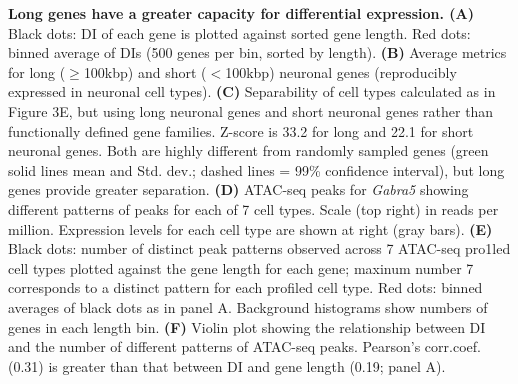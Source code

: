 \textbf{Long genes have a greater capacity for differential expression. (A)} Black dots: DI of each gene is plotted against sorted gene length. Red dots: binned average of DIs (500 genes per bin, sorted by length). \textbf{(B)} Average metrics for long ($\geq$100kbp) and short ($<$100kbp) neuronal genes (reproducibly expressed in neuronal cell types). \textbf{(C)} Separability of cell types calculated as in Figure 3E, but using long neuronal genes and short neuronal genes rather than functionally defined gene families. Z-score is 33.2 for long and 22.1 for short neuronal genes. Both are highly different from randomly sampled genes (green solid lines mean and Std. dev.; dashed lines = 99\% confidence interval), but long genes provide greater separation. \textbf{(D)} ATAC-seq peaks for \textit{Gabra5} showing different patterns of peaks for each of 7 cell types. Scale (top right) in reads per million. Expression levels for each cell type are shown at right (gray bars). \textbf{(E)} Black dots: number of distinct peak patterns observed across 7 ATAC-seq pro1led cell types plotted against the gene length for each gene; maxinum number 7 corresponds to a distinct pattern for each profiled cell type. Red dots: binned averages of black dots as in panel A. Background histograms show numbers of genes in each length bin. \textbf{(F)} Violin plot showing the relationship between DI and the number of different patterns of ATAC-seq peaks. Pearson's corr.coef. (0.31) is greater than that between DI and gene length (0.19; panel A).  